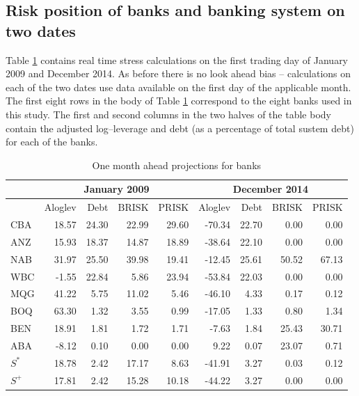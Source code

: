 \documentclass[authoryear]{elsarticle}
\newcommand{\E}{{\mathrm E}}
\newcommand{\tref}[1]{Table \ref{#1}}
\newcommand{\br}{\ensuremath{\mathrm{BRISK}}}
\newcommand{\pr}{\ensuremath{\mathrm{PRISK}}}
\begin{document}
\subsection{Risk position of banks and banking system on two dates}

\tref{twodates} contains real time stress calculations on the first trading day of  January 2009 and December 2014.  As before there is no look ahead bias -- calculations on each of the two dates use data available on the first day of the applicable month.   The first eight rows in the body of \tref{twodates} correspond to the eight banks used in this study.  The first  and second columns in the two halves of the table body contain the adjusted log--leverage  and debt  (as a percentage of total sustem debt) for each of the banks. 

\begin{table}[ht]
\caption{One month ahead projections for banks}
\label{twodates}
\centering
\begin{threeparttable}
\small
\vspace{4mm}
\begin{tabular}{l|rrrr|rrrr}
\hline
&\multicolumn{4}{c|}{January 2009}&\multicolumn{4}{c}{December 2014}\\
  \hline
   & Aloglev& Debt & \br  & \pr  & Aloglev & Debt  &\br & \pr\\  
  \hline
CBA & 18.57 & 24.30 & 22.99 & 29.60 & -70.34 & 22.70 & 0.00 & 0.00 \\ 
  ANZ & 15.93 & 18.37 & 14.87 & 18.89 & -38.64 & 22.10 & 0.00 & 0.00 \\ 
  NAB & 31.97 & 25.50 & 39.98 & 19.41 & -12.45 & 25.61 & 50.52 & 67.13 \\ 
  WBC & -1.55 & 22.84 & 5.86 & 23.94 & -53.84 & 22.03 & 0.00 & 0.00 \\ 
  MQG & 41.22 & 5.75 & 11.02 & 5.46 & -46.10 & 4.33 & 0.17 & 0.12 \\ 
  BOQ & 63.30 & 1.32 & 3.55 & 0.99 & -17.05 & 1.33 & 0.80 & 1.34 \\ 
  BEN & 18.91 & 1.81 & 1.72 & 1.71 & -7.63 & 1.84 & 25.43 & 30.71 \\ 
  ABA & -8.12 & 0.10 & 0.00 & 0.00 & 9.22 & 0.07 & 23.07 & 0.71 \\ 
  \hline
  $S^*$ & 18.78 & 2.42 & 17.17 & 8.63 & -41.91 & 3.27 & 0.03 & 0.12 \\ 
  $S^+$ & 17.81 & 2.42 & 15.28 & 10.18 & -44.22 & 3.27 & 0.00 & 0.00 \\ \hline

\end{tabular}
\end{threeparttable}
\end{table}
\end{document}
